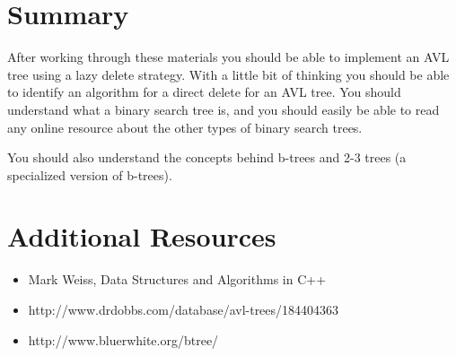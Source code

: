 \section{Summary}

After working through these materials you should be able to implement an AVL tree using a lazy delete strategy.  With a little bit of thinking you should be able to identify an algorithm for a direct delete for an AVL tree.  You should understand what a binary search tree is, and you should easily be able to read any online resource about the other types of binary search trees.  

 You should also understand the concepts behind b-trees and 2-3 trees (a specialized version of b-trees).   

\section{Additional Resources}
\begin{itemize}
	\item Mark Weiss, Data Structures and Algorithms in C++
	\item http://www.drdobbs.com/database/avl-trees/184404363
	\item http://www.bluerwhite.org/btree/
\end{itemize}

